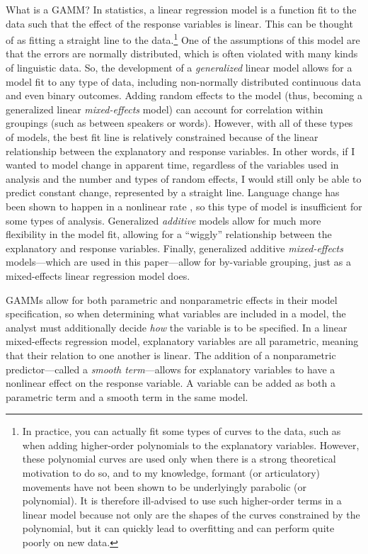 What is a GAMM? In statistics, a linear regression model is a function fit to the data such that the effect of the response variables is linear. This can be thought of as fitting a straight line to the data.\footnote{In practice, you can actually fit some types of curves to the data, such as when adding higher-order polynomials to the explanatory variables. However, these polynomial curves are used only when there is a strong theoretical motivation to do so, and to my knowledge, formant (or articulatory) movements have not been shown to be underlyingly parabolic (or polynomial). It is therefore ill-advised to use such higher-order terms in a linear model because not only are the shapes of the curves constrained by the polynomial, but it can quickly lead to overfitting and can perform quite poorly on new data.} One of the assumptions of this model are that the errors are normally distributed, which is often violated with many kinds of linguistic data. So, the development of a \textit{generalized} linear model allows for a model fit to any type of data, including non-normally distributed continuous data and even binary outcomes. Adding random effects to the model (thus, becoming a generalized linear \textit{mixed-effects} model) can account for correlation within groupings (such as between speakers or words). However, with all of these types of models, the best fit line is relatively constrained because of the linear relationship between the explanatory and response variables. In other words, if I wanted to model change in apparent time, regardless of the variables used in analysis and the number and types of random effects, I would still only be able to predict constant change, represented by a straight line. Language change has been shown to happen in a nonlinear rate \citep[cf.][]{fruehwald_2017}, so this type of model is insufficient for some types of analysis. Generalized \textit{additive} models allow for much more flexibility in the model fit, allowing for a ``wiggly'' relationship between the explanatory and response variables. Finally, generalized additive \textit{mixed-effects} models---which are used in this paper---allow for by-variable grouping, just as a mixed-effects linear regression model does.

GAMMs allow for both parametric and nonparametric effects in their model specification, so when determining what variables are included in a model, the analyst must additionally decide \textit{how} the variable is to be specified. In a linear mixed-effects regression model, explanatory variables are all parametric, meaning that their relation to one another is linear. The addition of a nonparametric predictor---called a \textit{smooth term}---allows for explanatory variables to have a nonlinear effect on the response variable. A variable can be added as both a parametric term and a smooth term in the same model.

